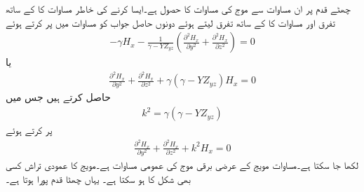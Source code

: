 چھٹے قدم پر ان مساوات سے موج کی مساوات کا حصول ہے۔ایسا کرنے کی خاطر مساوات  کا  کے ساتھ تفرق اور مساوات  کا  کے ساتھ تفرق لیتے ہوئے دونوں حاصل جواب کو مساوات  میں پر کرتے ہوئے
\begin{align*}
-\gamma H_x-\frac{1}{\gamma -Y Z_{yz}} \left(\frac{\partial^2 H_x}{\partial y^2}+\frac{\partial^2 H_x}{\partial z^2} \right)=0
\end{align*}
یا
\begin{align*}
\frac{\partial^2 H_x}{\partial y^2}+\frac{\partial^2 H_x}{\partial z^2}+\gamma \left(\gamma-Y Z_{yz} \right)H_x =0
\end{align*}
حاصل کرتے ہیں جس میں
\begin{align}\label{مساوات_مویج_ڑ}
k^2=\gamma \left(\gamma-Y Z_{yz}\right)
\end{align}
پر کرتے ہوئے
\begin{align}\label{مساوات_مویج_ز}
\frac{\partial^2 H_x}{\partial y^2}+\frac{\partial^2 H_x}{\partial z^2}+k^2 H_x =0
\end{align}
لکھا جا سکتا ہے۔مساوات  مویج کے عرضی برقی موج کی عمومی مساوات ہے۔مویج کا عمودی تراش کسی بھی شکل کا ہو سکتا ہے۔ یہاں چھٹا قدم پورا ہوتا ہے۔

